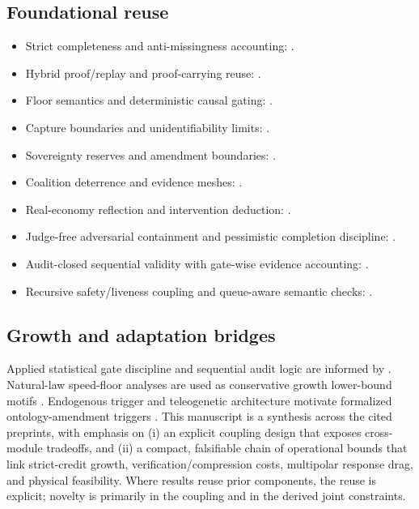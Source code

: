 \documentclass[11pt,a4paper]{article}
\theoremstyle{definition}
\theoremstyle{remark}
\begin{document}
\subsection{Foundational reuse}
\begin{itemize}
  \item Strict completeness and anti-missingness accounting: \cite{Takahashi2026VerificationLimited}.
  \item Hybrid proof/replay and proof-carrying reuse: \cite{Takahashi2026OOPCA,Takahashi2026ProofCarryingSkills,Takahashi2026PipelineContracts}.
  \item Floor semantics and deterministic causal gating: \cite{Takahashi2026Floors,Takahashi2026ONCAP}.
  \item Capture boundaries and unidentifiability limits: \cite{Takahashi2026ObsCapture,Takahashi2026Unidentifiable,Blackwell1953}.
  \item Sovereignty reserves and amendment boundaries: \cite{Takahashi2026ConstitutionalSov,Takahashi2026AgendaSov,Takahashi2026Liberty}.
  \item Coalition deterrence and evidence meshes: \cite{Takahashi2026StructuralRisk,Takahashi2026DePINMesh}.
  \item Real-economy reflection and intervention deduction: \cite{Takahashi2026RealEconomy,Takahashi2026OperationalRules}.
  \item Judge-free adversarial containment and pessimistic completion discipline: \cite{Takahashi2026NoJudgeContainment}.
  \item Audit-closed sequential validity with gate-wise evidence accounting: \cite{Takahashi2026AuditClosed,Takahashi2025AuditedLoop}.
  \item Recursive safety/liveness coupling and queue-aware semantic checks: \cite{Takahashi2026QONC}.
\end{itemize}

\subsection{Growth and adaptation bridges}
Applied statistical gate discipline and sequential audit logic are informed by \cite{Takahashi2026AuditClosed,Takahashi2025AuditedLoop}.
Natural-law speed-floor analyses are used as conservative growth lower-bound motifs \cite{Takahashi2025DailyExplosive,Takahashi2025VPO,Takahashi2025PersistenceCreation,Takahashi2025AssumptionMin,Landauer1961}.
Endogenous trigger and teleogenetic architecture motivate formalized ontology-amendment triggers \cite{Takahashi2025EndogenousTrigger,Takahashi2025Teleogenetic}.
This manuscript is a synthesis across the cited preprints, with emphasis on
(i) an explicit coupling design that exposes cross-module tradeoffs, and
(ii) a compact, falsifiable chain of operational bounds that link strict-credit growth, verification/compression costs, multipolar response drag, and physical feasibility.
Where results reuse prior components, the reuse is explicit; novelty is primarily in the coupling and in the derived joint constraints.
\end{document}

